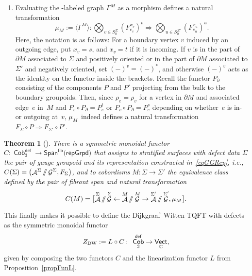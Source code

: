 \documentclass[10pt,a4paper]{amsart}
\DeclareMathOperator{\vect}{\mathsf{Vect}}
\DeclareMathOperator{\C}{\mathbb{C}}
\DeclareMathOperator{\Cob}{\mathsf{Cob}}
\DeclareMathOperator{\cala}{\mathcal{A}}
\DeclareMathOperator{\calg}{\mathcal{G}}
\newcommand{\sslash}{\mathbin{/\mkern-6mu/}}
\numberwithin{equation}{section}
\newtheorem{Theorem}{Theorem}[section]
\theoremstyle{definition}
\begin{document}
\begin{enumerate}
 Altogether, the result is a graph $\Gamma^M$ labeled in the monoidal category \smash{$\vect_{\C}^{\cala^M \sslash \calg^M}$}. The graph has a well-defined evaluation to a morphism in \smash{$\vect_{\C}^{\cala^M \sslash \calg^M}$} because the category is spherical and symmetric.
 \item Evaluating the \smash{$\vect_{\C}^{\cala^M \sslash \calg^M}$}-labeled graph $\Gamma^M$ as a morphism defines a natural transformation
 \[
 \mu_M := \bigl\langle \Gamma^M\bigr\rangle\colon \bigotimes_{v \in S_0^{\Sigma}} (F_{e_v}^{x_v})^v \Rightarrow \bigotimes_{u \in S_0^{\Sigma'}} (F_{e_u}^{x_u})^u.
\]
Here, the notation is as follows: For a boundary vertex $v$ induced by an outgoing edge, put $x_v = s$, and $x_v = t$ if it is incoming. If $v$ is in the part of $\partial M$ associated to $\Sigma$ and positively oriented or in the part of $\partial M$ associated to $\Sigma'$ and negatively oriented, set $(-)^v = (-)^*$, and otherwise $(-)^v$ acts as the identity on the functor inside the brackets. Recall the functor $P_{\partial}$ consisting of the components $P$ and $P'$ projecting from the bulk to the boundary groupoids. Then, since $\rho_e = \rho_v$ for a vertex in $\partial M$ and associated edge~$e$ in~$M$ and $P_v \circ P_{\partial} = P_e^t$ or $P_v \circ P_{\partial} = P_e^s$ depending on whether~$e$ is in- or outgoing at~$v$, $\mu_M$~indeed defines a natural transformation $F_{\Sigma} \circ P \Rightarrow F_{\Sigma'} \circ P'$.
\end{enumerate}
\begin{Theorem}[{\cite[Proposition 6.7]{FMM}}]
 There is a symmetric monoidal functor $C\colon \Cob_3^{\mathsf{def}} \rightarrow \mathsf{Span}^{\mathsf{fib}}(\mathsf{repGrpd)} $ that assigns to stratified surfaces with defect data $\Sigma$ the pair of gauge groupoid and its representation constructed in~\eqref{eqGGRep}, i.e., $C(\Sigma) = \bigl(\cala^{\Sigma} \sslash \calg^{\Sigma}, F_{\Sigma}\bigr)$, and to cobordisms $M\colon \Sigma \rightarrow \Sigma'$ the equivalence class defined by the pair of fibrant span and natural transformation
 \begin{align*}
 C(M) = \bigl[\cala^{\Sigma} \sslash \calg^{\Sigma} \leftarrow \cala^M \sslash \calg^M \rightarrow \cala^{\Sigma'} \sslash \calg^{\Sigma'}, \mu_M\bigr].
 \end{align*}
\end{Theorem}
This finally makes it possible to define the Dijkgraaf--Witten TQFT with defects as the symmetric monoidal functor \cite[Theorem 6.8]{FMM}
\begin{align}
 Z_{\rm DW} := L \circ C\colon \ \Cob_3^{\mathsf{def}} \rightarrow \vect_{\C},
\end{align}
given by composing the two functors $C$ and the linearization functor $L$ from Proposition~\ref{propFunL}.
\end{document}
